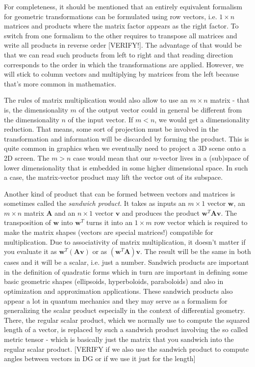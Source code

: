 \medskip
For completeness, it should be mentioned that an entirely equivalent formalism for geometric transformations can be formulated using row vectors, i.e. $1 \times n$ matrices and products where the matrix factor appears as the right factor. To switch from one formalism to the other requires to transpose all matrices and write all products in reverse order [VERIFY!]. The advantage of that would be that we can read such products from left to right and that reading direction corresponds to the order in which the transformations are applied. However, we will stick to column vectors and multiplying by matrices from the left because that's more common in mathematics. 

\medskip
The rules of matrix multiplication would also allow to use an $m \times n$ matrix - that is, the dimensionality $m$ of the output vector could in general be different from the dimensionality $n$ of the input vector. If $m < n$, we would get a dimensionality reduction. That means, some sort of projection must be involved in the transformation and information will be discarded by forming the product. This is quite common in graphics when we eventually need to project a 3D scene onto a 2D screen. The $m > n$ case would mean that our $n$-vector lives in a (sub)space of lower dimensionality that is embedded in some higher dimensional space. In such a case, the matrix-vector product may lift the vector out of its subspace.

\medskip
Another kind of product that can be formed between vectors and matrices is sometimes called the \emph{sandwich product}. It takes as inputs an $m \times 1$ vector $\mathbf{w}$, an $m \times n$ matrix $\mathbf{A}$ and an $n \times 1$ vector $\mathbf{v}$ and produces the product $\mathbf{w}^T \mathbf{A v}$. The transposition of $\mathbf{w}$ into $\mathbf{w}^T$ turns it into an $1 \times m$ row vector which is required to make the matrix shapes (vectors are special matrices!) compatible for multiplication. Due to associativity of matrix multiplication, it doesn't matter if you evaluate it as $\mathbf{w}^T (\mathbf{A v})$ or as $(\mathbf{w}^T \mathbf{A}) \mathbf{v}$. The result will be the same in both cases and it will be a scalar, i.e. just a number. Sandwich products are important in the definition of quadratic forms which in turn are important in defining some basic geometric shapes (ellipsoids, hyperboloids, paraboloids) and also in optimization and approximation applications. These sandwich products also appear a lot in quantum mechanics and they may serve as a formalism for generalizing the scalar product especially in the context of differential geometry.  There, the regular scalar product, which we normally use to compute the squared length of a vector, is replaced by such a sandwich product involving the so called metric tensor - which is basically just the matrix that you sandwich into the regular scalar product. [VERIFY if we also use the sandwich product to compute angles between vectors in DG or if we use it just for the length]

